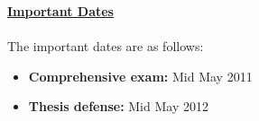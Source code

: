 \documentclass[a4,12pt]{report}
\begin{document}
\large\underline{\textbf{Important Dates}}\\\\
\normalsize
The important dates are as follows:
\begin{itemize}
\item \textbf{Comprehensive exam:} Mid May 2011
\item\textbf{Thesis defense:} Mid May 2012
\end{itemize}


{\small }
\end{document}
